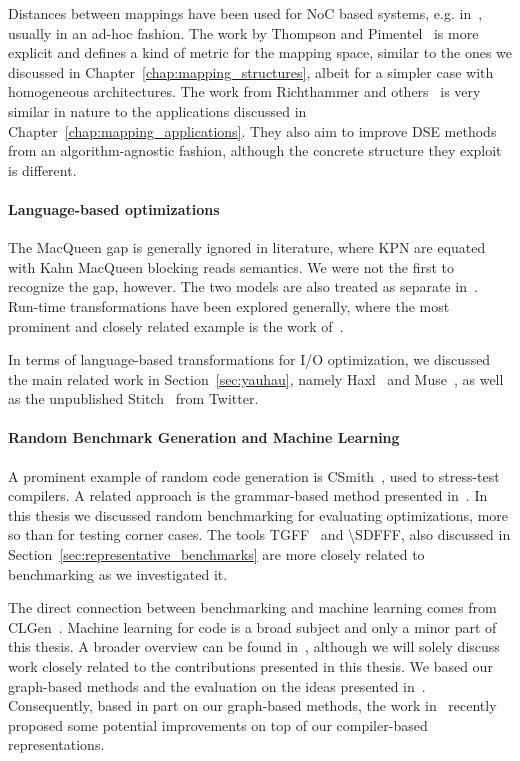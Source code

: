 Distances between mappings have been used for \ac{NoC} based systems, e.g. in~\cite{singh2010communication,weichslgartner2014daarm}, usually in an ad-hoc fashion.
The work by Thompson and Pimentel~\cite{thompson2013exploiting} is more explicit and defines a kind of metric for the mapping space, similar to the ones we discussed in Chapter~\ref{chap:mapping_structures}, albeit for a simpler case with homogeneous architectures.
The work from Richthammer and others~\cite{richthammer2018search,richthammer_todaes20} is very similar in nature to the applications discussed in Chapter~\ref{chap:mapping_applications}.
They also aim to improve \ac{DSE} methods from an algorithm-agnostic fashion, although the concrete structure they exploit is different.

\paragraph{Language-based optimizations} 
The MacQueen gap is generally ignored in literature, where \ac{KPN} are equated with Kahn MacQueen blocking reads semantics. 
We were not the first to recognize the gap, however.
The two models are also treated as separate in~\cite{lee_matsikoudis_semantics}.
Run-time transformations have been explored generally, where the most prominent and closely related example is the work of~\cite{schor2014adapnet}.

In terms of language-based transformations for \ac{I/O} optimization, we discussed the main related work in Section~\ref{sec:yauhau}, namely Haxl~\cite{marlow2014haxl} and Muse~\cite{muse},
as well as the unpublished Stitch~\cite{stitch} from Twitter.

\paragraph{Random Benchmark Generation and Machine Learning}
A prominent example of random code generation is CSmith~\cite{csmith}, used to stress-test compilers.
A related approach is the grammar-based method presented in~\cite{mckenzie1997generating}.
In this thesis we discussed random benchmarking for evaluating optimizations, more so than for testing corner cases.
The tools \ac{TGFF}~\cite{dick1998tgff} and \ac{\SDFFF}\cite{sdf3}, also discussed in Section~\ref{sec:representative_benchmarks} are more closely related to benchmarking as we investigated it.

The direct connection between benchmarking and machine learning comes from CLGen~\cite{cummins_cgo2017}.
Machine learning for code is a broad subject and only a minor part of this thesis.
A broader overview can be found in~\cite{allamanis2018survey}, although we will solely discuss work closely related to the contributions presented in this thesis. 
We based our graph-based methods and the evaluation on the ideas presented in~\cite{cummins_pact17,inst2vec}.
Consequently, based in part on our graph-based methods, the work in~\cite{cummins_programl,ye2020deep} recently proposed some potential improvements on top of our compiler-based representations.